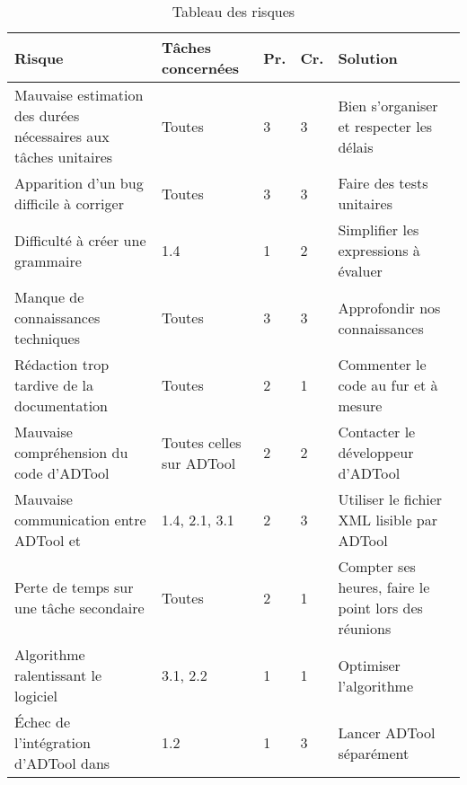 	\begin{table}[H]
		\centering
		\begin{tabular}{|p{4cm}|l|l|l|p{4cm}|}
		\hline
            \textbf{Risque} & \textbf{Tâches concernées} & \textbf{Pr.} & \textbf{Cr.} & \textbf{Solution}\\
            \hline
            Mauvaise estimation des durées nécessaires aux tâches unitaires & 
                Toutes & 3 & 3 &
                Bien s'organiser et respecter les délais\\ 
            \hline
            Apparition d'un bug difficile à corriger & 
                Toutes & 3 & 3 &
                Faire des tests unitaires\\
            \hline
            Difficulté à créer une grammaire & 
                1.4 & 1 & 2 &
                Simplifier les expressions à évaluer\\ 
            \hline
            Manque de connaissances techniques & 
                Toutes & 3 & 3 &
                Approfondir nos connaissances\\ 
            \hline
            Rédaction trop tardive de la documentation & 
                Toutes & 2 & 1 &
                Commenter le code au fur et à mesure\\
            \hline
            Mauvaise compréhension du code d'ADTool & 
                Toutes celles sur ADTool & 2 & 2 &
                Contacter le développeur d'ADTool\\ 
            \hline
            Mauvaise communication entre ADTool et \glasir{} & 
                1.4, 2.1, 3.1 & 2 & 3 &
                Utiliser le fichier XML lisible par ADTool\\ 
            \hline
            Perte de temps sur une tâche secondaire & 
                Toutes & 2 & 1 &
                Compter ses heures, faire le point lors des réunions\\ 
            \hline
            Algorithme ralentissant le logiciel & 
                3.1, 2.2 & 1 & 1 &
                Optimiser l’algorithme\\ 
            \hline
            Échec de l'intégration d'ADTool dans \glasir{} & 
                1.2 & 1 & 3 &
                Lancer ADTool séparément\\ 
            \hline
		\end{tabular}
		\caption{Tableau des risques}
		\label{fig:risques}
	\end{table}
	
